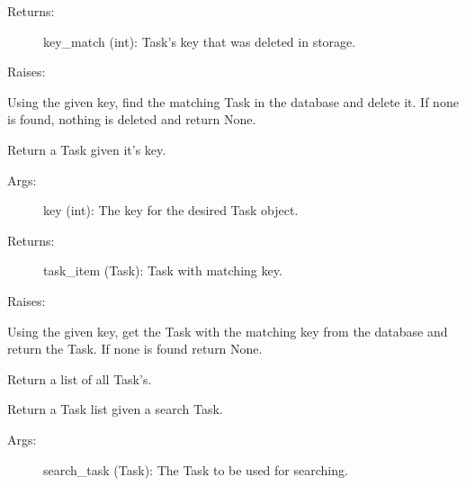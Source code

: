 \documentclass[letterpaper,10pt,english]{sphinxmanual}
\begin{document}
\begin{fulllineitems}
\begin{fulllineitems}
\begin{description}
\item[{Returns:}] \leavevmode
key\_match (int): Task's key that was deleted in storage.

\end{description}

Raises:

Using the given key, find the matching Task in the database and
delete it. If none is found, nothing is deleted and return None.

\end{fulllineitems}



\begin{fulllineitems}
\label{index:storage.SQLiteStorage.find}
Return a Task given it's key.
\begin{description}
\item[{Args:}] \leavevmode
key (int): The key for the desired Task object.

\item[{Returns:}] \leavevmode
task\_item (Task): Task with matching key.

\end{description}

Raises:

Using the given key, get the Task with the matching key from the
database and return the Task. If none is found return None.

\end{fulllineitems}



\begin{fulllineitems}
\label{index:storage.SQLiteStorage.get_all}
Return a list of all Task's.

\end{fulllineitems}



\begin{fulllineitems}
\label{index:storage.SQLiteStorage.search}
Return a Task list given a search Task.
\begin{description}
\item[{Args:}] \leavevmode
search\_task (Task): The Task to be used for searching.


\end{description}
\end{fulllineitems}
\end{fulllineitems}
\end{document}
